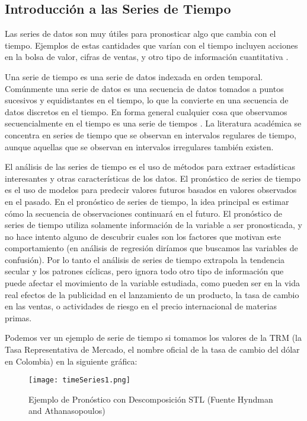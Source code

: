 \begin{spacing}{1.5}
\subsection{Introducción a las Series de Tiempo}
Las series de datos son muy útiles para pronosticar algo que cambia con el tiempo. Ejemplos de estas cantidades que varían con el tiempo incluyen acciones en la bolsa de valor, cifras de ventas, y otro tipo de información cuantitativa \cite{hyndman}.

Una serie de tiempo es una serie de datos indexada en orden temporal. Comúnmente una serie de datos es una secuencia de datos tomados a puntos sucesivos y equidistantes en el tiempo, lo que la convierte en una secuencia de datos discretos en el tiempo. En forma general cualquier cosa que observamos secuencialmente en el tiempo es una serie de tiempos \cite{hyndman}. La literatura académica se concentra en series de tiempo que se observan en intervalos regulares de tiempo, aunque aquellas que se observan en intervalos irregulares también existen. 

El análisis de las series de tiempo es el uso de métodos para extraer estadísticas interesantes y otras características de los datos. El pronóstico de series de tiempo es el uso de modelos para predecir valores futuros basados en valores observados en el pasado. En el pronóstico de series de tiempo, la idea principal es estimar cómo la secuencia de observaciones continuará en el futuro. El pronóstico de series de tiempo utiliza solamente información de la variable a ser pronosticada, y no hace intento alguno de descubrir cuales son los factores que motivan este comportamiento (en análisis de regresión diríamos que buscamos las variables de confusión). Por lo tanto el análisis de series de tiempo extrapola la tendencia secular y los patrones cíclicas, pero ignora todo otro tipo de información que puede afectar el movimiento de la variable estudiada, como pueden ser en la vida real efectos de la publicidad en el lanzamiento de un producto, la tasa de cambio en las ventas, o actividades de riesgo en el precio internacional de materias primas. 

Podemos ver un ejemplo de serie de tiempo si tomamos los valores de la TRM (la Tasa Representativa de Mercado, el nombre oficial de la tasa de cambio del dólar en Colombia) en la siguiente gráfica:

\begin{figure}[h!]
    \centering
    \texttt{[image: timeSeries1.png]}
    \caption{Ejemplo de Pronóstico con Descomposición STL (Fuente Hyndman and Athanasopoulos)}
\end{figure}


\end{spacing}
